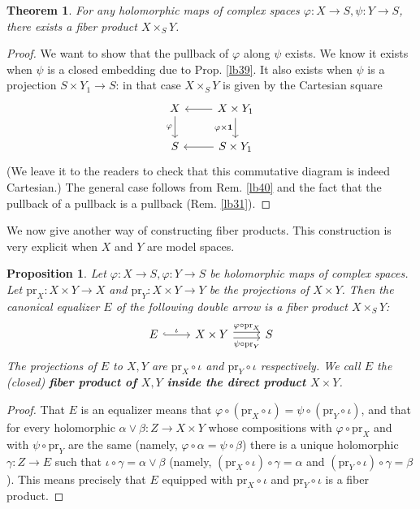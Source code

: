 \documentclass[12pt,b5paper,notitlepage]{report}
\theoremstyle{definition}
\theoremstyle{plain}
\newtheorem{thm}[df]{Theorem}
\newtheorem{pp}[df]{Proposition}
\newcommand{\id}{\mathbf{1}}
\newcommand{\pr}{\mathrm {pr}}
\numberwithin{equation}{section}
\begin{document}
\begin{thm}
For any holomorphic maps of complex spaces $\varphi:X\rightarrow S,\psi:Y\rightarrow S$, there exists a fiber product $X\times_SY$.
\end{thm}
\begin{proof}
We want to show that the pullback of $\varphi$ along $\psi$ exists. We know it exists when $\psi$ is a closed embedding due to Prop. \ref{lb39}. It also exists when $\psi$ is a projection $S\times Y_1\rightarrow S$: in that case $X\times_SY$ is given by the Cartesian square
\begin{equation}
\begin{tikzcd}
X \arrow[d, "\varphi"'] & X\times Y_1 \arrow[l] \arrow[d, "\varphi\times\id"'] \\
S                       & S\times Y_1 \arrow[l]                               
\end{tikzcd}
\end{equation}
(We leave it to the readers to check that this commutative diagram is indeed Cartesian.) The general case follows from Rem. \ref{lb40} and the fact that the pullback of a pullback is a pullback (Rem. \ref{lb31}).
\end{proof}



We now give another way of constructing fiber products. This construction is very explicit when $X$ and $Y$ are model spaces.


\begin{pp}\label{lb90}
Let $\varphi:X\rightarrow S,\varphi:Y\rightarrow S$ be holomorphic maps of complex spaces. Let $\pr_X:X\times Y\rightarrow X$ and $\pr_Y:X\times Y\rightarrow Y$ be the projections of $X\times Y$. Then the canonical equalizer $E$ of the following double arrow is a fiber product $X\times_SY$:
\begin{equation}
\begin{tikzcd}
E \arrow[r,hook,"\iota"] & X\times Y \arrow[r, shift left, "\varphi\circ\pr_X"] \arrow[r, shift right, "\psi\circ\pr_Y"'] & S
\end{tikzcd}
\end{equation}
The projections of $E$ to $X,Y$ are $\pr_X\circ\iota$ and $\pr_Y\circ\iota$ respectively. We call $E$ the (closed) \textbf{fiber product of $X,Y$ inside the direct product $X\times Y$}. 
\end{pp}


\begin{proof}
That $E$ is an equalizer means that $\varphi\circ(\pr_X\circ\iota)=\psi\circ(\pr_Y\circ\iota)$, and that for every holomorphic $\alpha\vee\beta:Z\rightarrow X\times Y$ whose compositions with $\varphi\circ\pr_X$ and with $\psi\circ\pr_Y$ are the same (namely, $\varphi\circ\alpha=\psi\circ\beta$) there is a unique holomorphic $\gamma:Z\rightarrow E$ such that $\iota\circ\gamma=\alpha\vee\beta$ (namely, $(\pr_X\circ\iota)\circ\gamma=\alpha$ and $(\pr_Y\circ\iota)\circ\gamma=\beta$). This means precisely that $E$ equipped with $\pr_X\circ\iota$ and $\pr_Y\circ\iota$ is a fiber product. 
\end{proof}
\end{document}
